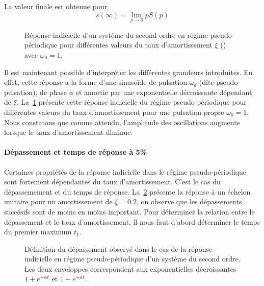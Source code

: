 La valeur finale est obtenue pour 
$$
s(\infty)=\lim\limits_{p\to 0}pS(p)
$$

\begin{figure}[!t]
\begin{center}

\caption{Réponse indicielle d'un système du second ordre en régime 
         pseudo-périodique pour différentes valeurs du taux d'amortissement 
         $\xi$ () avec $\omega_0=1$. \label{fig-2nd_pp}}
\end{center}
\end{figure}

Il est maintenant possible d'interpréter les différentes grandeurs 
introduites. En effet, cette réponse a la forme d'une sinuso\"ide 
de pulsation $\omega_d$ (dite pseudo-pulsation), de phase $\phi$ et 
amortie par une exponentielle décroissante dépendant de $\xi$.
La~\cref{fig-2nd_pp} présente cette réponse indicielle du régime 
pseudo-périodique pour différentes valeurs du taux d'amortissement pour 
une pulsation propre $\omega_0=1$. Nous constatons que comme attendu, 
l'amplitude des oscillations augmente lorsque le taux d'amortissement diminue.

\newpage
\paragraph{Dépassement et temps de réponse à 5\%}
Certaines propriétés de la réponse indicielle dans le régime pseudo-périodique 
sont fortement dépendantes du taux d'amortissement. C'est le cas du 
dépassemement et du temps de réponse. La~\cref{fig-2nd_depassement_1} présente 
la réponse à un échelon unitaire pour un amortissement de $\xi=0.2$, 
on observe que les dépassements succésifs sont de moins en moins important. 
Pour déterminer la relation entre le dépassement et le taux d'amortissement, 
il nous faut d'abord déterminer le temps du premier maximum $t_1$.


\begin{figure}[!h]
    \centering
    
    \caption{Définition du dépassement observé dans le cas de la réponse 
             indicielle en régime pseudo-périodique d'un système du second 
             ordre. Les deux enveloppes correspondent aux exponentielles 
             décroissantes $1+e^{-\alpha t}$ et $1-e^{-\alpha t}$. 
             \label{fig-2nd_depassement_1}}
\end{figure}

